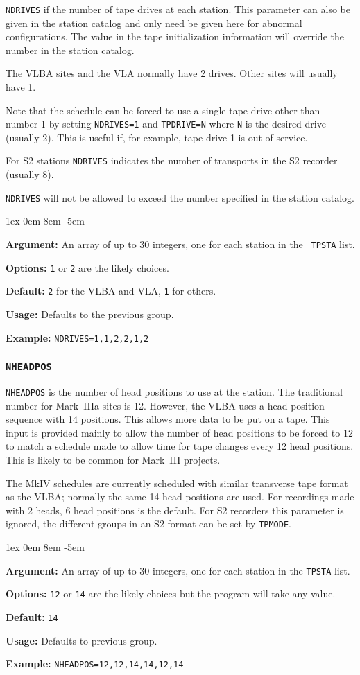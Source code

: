 \documentclass{report}
\newcommand{\rcwbox}[5]{
  \begin{list}{}{\parsep 1ex  \itemsep 0em
                 \leftmargin 8em  \itemindent -5em }
    \item {\bf Argument:} #1
    \item {\bf Options:}  #2
    \item {\bf Default:}  #3
    \item {\bf Usage:}    #4
    \item {\bf Example:}  #5
  \end{list}
}
\begin{document}
{\tt NDRIVES} if the number of tape drives at each station. This
parameter can also be given in the station catalog and only need
be given here for abnormal configurations.  The value in the
tape initialization information will override the number in the
station catalog.

The VLBA sites and the VLA normally have 2 drives.
Other sites will usually have 1.

Note that the schedule can be forced to use a single tape drive other
than number 1 by setting {\tt NDRIVES=1} and {\tt TPDRIVE=N} where
{\tt N} is the desired drive (usually 2). This is useful if, for
example, tape drive 1 is out of service.

For S2 stations {\tt NDRIVES} indicates the number of transports in the
S2 recorder (usually 8).

{\tt NDRIVES} will not be allowed to exceed the number specified in
the station catalog.

\rcwbox
{An array of up to 30 integers, one for each station in the {\tt
TPSTA} list.}
{{\tt 1} or {\tt 2} are the likely choices.}
{{\tt 2} for the VLBA and VLA, {\tt 1} for others.}
{Defaults to the previous group.}
{{\tt NDRIVES=1,1,2,2,1,2}}

\subsubsection{\label{TP:NHEADPOS}{\tt NHEADPOS}}

{\tt NHEADPOS} is the number of head positions to use at the
station. The traditional number for Mark~IIIa sites is 12. However,
the VLBA uses a head position sequence with 14 positions. This allows
more data to be put on a tape. This input is provided mainly to allow
the number of head positions to be forced to 12 to match a schedule
made to allow time for tape changes every 12 head positions. This is
likely to be common for Mark~III projects.

The MkIV schedules are currently scheduled with similar
transverse tape format as the VLBA; normally the same 14 head
positions are used. For recordings made with 2 heads, 6 head
positions is the default.
For S2 recorders this parameter is ignored, the
different groups in an S2 format can be set by {\tt TPMODE}.


\rcwbox
{An array of up to 30 integers, one for each station in the
{\tt TPSTA} list.}
{{\tt 12} or {\tt 14} are the likely choices but the program will
take any value.}
{{\tt 14}}
{Defaults to previous group.}
{{\tt NHEADPOS=12,12,14,14,12,14}}
\end{document}
